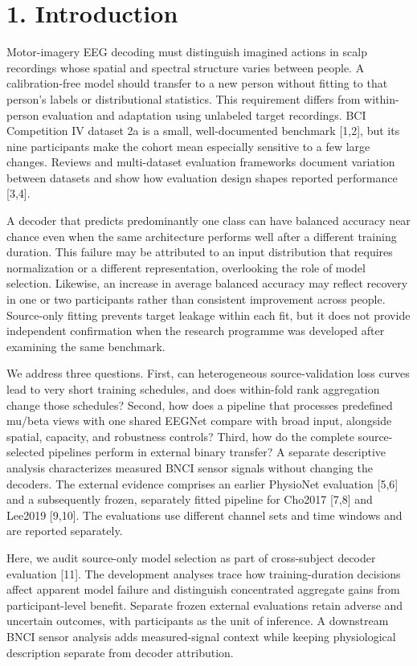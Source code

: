 \documentclass[11pt]{article}
\begin{document}
\section*{1. Introduction}
Motor-imagery EEG decoding must distinguish imagined actions in scalp recordings whose spatial and spectral structure varies between people. A calibration-free model should transfer to a new person without fitting to that person's labels or distributional statistics. This requirement differs from within-person evaluation and adaptation using unlabeled target recordings. BCI Competition IV dataset 2a is a small, well-documented benchmark [1,2], but its nine participants make the cohort mean especially sensitive to a few large changes. Reviews and multi-dataset evaluation frameworks document variation between datasets and show how evaluation design shapes reported performance [3,4].

A decoder that predicts predominantly one class can have balanced accuracy near chance even when the same architecture performs well after a different training duration. This failure may be attributed to an input distribution that requires normalization or a different representation, overlooking the role of model selection. Likewise, an increase in average balanced accuracy may reflect recovery in one or two participants rather than consistent improvement across people. Source-only fitting prevents target leakage within each fit, but it does not provide independent confirmation when the research programme was developed after examining the same benchmark.

We address three questions. First, can heterogeneous source-validation loss curves lead to very short training schedules, and does within-fold rank aggregation change those schedules? Second, how does a pipeline that processes predefined mu/beta views with one shared EEGNet compare with broad input, alongside spatial, capacity, and robustness controls? Third, how do the complete source-selected pipelines perform in external binary transfer? A separate descriptive analysis characterizes measured BNCI sensor signals without changing the decoders. The external evidence comprises an earlier PhysioNet evaluation [5,6] and a subsequently frozen, separately fitted pipeline for Cho2017 [7,8] and Lee2019 [9,10]. The evaluations use different channel sets and time windows and are reported separately.

Here, we audit source-only model selection as part of cross-subject decoder evaluation [11]. The development analyses trace how training-duration decisions affect apparent model failure and distinguish concentrated aggregate gains from participant-level benefit. Separate frozen external evaluations retain adverse and uncertain outcomes, with participants as the unit of inference. A downstream BNCI sensor analysis adds measured-signal context while keeping physiological description separate from decoder attribution.
\end{document}

